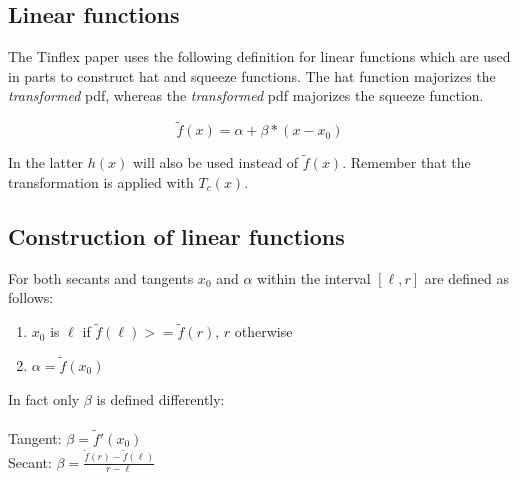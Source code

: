 \subsection{Linear functions}

The Tinflex paper uses the following definition for linear functions which are used in parts to construct hat and squeeze functions. The hat function majorizes the \textit{transformed} pdf, whereas the \textit{transformed} pdf majorizes the squeeze function.

\[ \tilde{f}(x) = \alpha + \beta * (x - x_0) \]

In the latter $h(x)$ will also be used instead of $\tilde{f}(x)$.
Remember that the transformation is applied with $T_c(x)$.

\subsection{Construction of linear functions}

For both secants and tangents $x_0$ and $\alpha$ within the interval $[\ell, r]$ are defined as follows:

\begin{enumerate}
\item $x_0$ is $\ell$ if $\tilde{f}(\ell) >= \tilde{f}(r)$, $r$ otherwise
\item $\alpha = \tilde{f}(x_0)$
\end{enumerate}

In fact only $\beta$ is defined differently: \\ 
\ \\
Tangent: $\beta = \tilde{f}'(x_0)$ \\ 
Secant:  $\beta = \frac{\tilde{f}(r) - \tilde{f}(\ell)}{r - \ell}$



